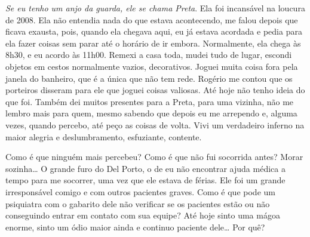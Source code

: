 \emph{Se eu tenho um anjo da guarda, ele se chama Preta}. Ela foi
incansável na loucura de 2008. Ela não entendia nada do que estava
acontecendo, me falou depois que ficava exausta, pois, quando ela
chegava aqui, eu já estava acordada e pedia para ela fazer coisas sem
parar até o horário de ir embora. Normalmente, ela chega às 8h30, e eu
acordo às 11h00. Remexi a casa toda, mudei tudo de lugar, escondi
objetos em cestos normalmente vazios, decorativos. Joguei muita coisa
fora pela janela do banheiro, que é a única que não tem rede. Rogério me
contou que os porteiros disseram para ele que joguei coisas valiosas.
Até hoje não tenho ideia do que foi. Também dei muitos presentes para a
Preta, para uma vizinha, não me lembro mais para quem, mesmo sabendo
que depois eu me arrependo e, alguma vezes, quando percebo, até
peço as coisas de volta. Vivi um verdadeiro inferno na maior alegria e
deslumbramento, esfuziante, contente.

Como é que ninguém mais percebeu? Como é que não fui socorrida antes?
Morar sozinha… O grande furo do Del Porto, o de eu não encontrar
ajuda médica a tempo para me socorrer, uma vez que ele estava de férias.
Ele foi um grande irresponsável comigo e com outros pacientes graves.
Como é que pode um psiquiatra com o gabarito dele não verificar se os
pacientes estão ou não conseguindo entrar em contato com sua equipe? Até
hoje sinto uma mágoa enorme, sinto um ódio maior ainda e continuo
paciente dele… Por quê?

